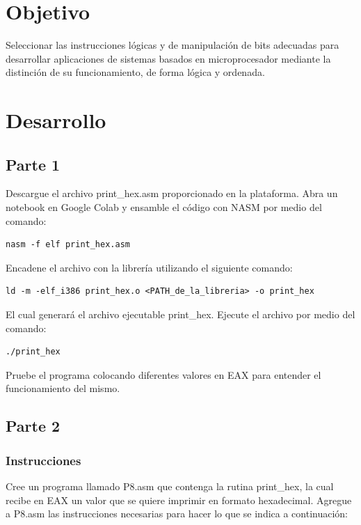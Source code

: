 \documentclass[12pt]{article}
\begin{document}
\section*{Objetivo}
\label{sec:org3175bb2}
Seleccionar las instrucciones lógicas y de manipulación de bits adecuadas
para desarrollar aplicaciones de sistemas basados en microprocesador
mediante la distinción de su funcionamiento, de forma lógica y ordenada.

\section*{Desarrollo}
\label{sec:orgd677130}
\subsection*{Parte 1}
\label{sec:org28ec5b1}
Descargue el archivo print\_hex.asm proporcionado en la plataforma. Abra un notebook en Google
Colab y ensamble el código con NASM por medio del comando:

\begin{verbatim}
nasm -f elf print_hex.asm
\end{verbatim}

Encadene el archivo con la librería utilizando el siguiente comando:

\begin{verbatim}
ld -m -elf_i386 print_hex.o <PATH_de_la_libreria> -o print_hex
\end{verbatim}

El cual generará el archivo ejecutable print\_hex.
Ejecute el archivo por medio del comando:

\begin{verbatim}
./print_hex
\end{verbatim}

Pruebe el programa colocando diferentes valores en EAX para entender el funcionamiento del
mismo.

\subsection*{Parte 2}
\label{sec:org123ffa9}
\subsubsection*{Instrucciones}
\label{sec:orgbc2368e}
Cree un programa llamado P8.asm que contenga la rutina print\_hex, la cual recibe en EAX un
valor que se quiere imprimir en formato hexadecimal. Agregue a P8.asm las instrucciones
necesarias para hacer lo que se indica a continuación:
\end{document}
